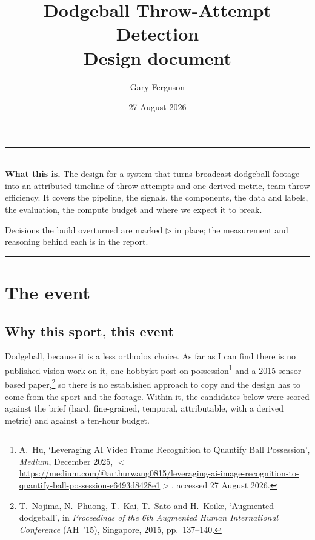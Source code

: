 \documentclass[10pt,a4paper]{article}
\title{\vspace{-16mm}\bfseries\color{slate}Dodgeball Throw-Attempt Detection\\[1mm]
       \large\mdseries Design document}
\author{Gary Ferguson}
\date{\vspace{-2mm}27 August 2026}
\begin{document}
\maketitle
\thispagestyle{empty}

\noindent
\begin{minipage}{\textwidth}
\small\color{slate}
\rule{\textwidth}{0.4pt}\\[3pt]
\textbf{What this is.} The design for a system that turns broadcast dodgeball footage
into an attributed timeline of throw attempts and one derived metric, team throw
efficiency. It covers the pipeline, the signals, the components, the data and labels,
the evaluation, the compute budget and where we expect it to break.

Decisions the build overturned are marked \textcolor{accent!88!black}{$\triangleright$}
in place; the measurement and reasoning behind each is in the report.\\[2pt]
\rule{\textwidth}{0.4pt}
\end{minipage}

\vspace{1mm}
{\small\setcounter{tocdepth}{2}\tableofcontents}
\clearpage

\section{The event}

\subsection{Why this sport, this event}

Dodgeball, because it is a less orthodox choice. As far as I can find there is no published
vision work on it, one hobbyist post on possession\footnote{A.\ Hu, `Leveraging
AI Video Frame Recognition to Quantify Ball Possession', \emph{Medium}, December 2025,
$<$\url{https://medium.com/@arthurwang0815/leveraging-ai-image-recognition-to-quantify-ball-possession-e6493d8428e1}$>$,
accessed 27 August 2026.} and a 2015 sensor-based
paper,\footnote{T.\ Nojima, N.\ Phuong,
T.\ Kai, T.\ Sato and H.\ Koike, `Augmented dodgeball', in \emph{Proceedings of the 6th
Augmented Human International Conference} (AH~'15), Singapore, 2015, pp.\ 137--140.} so there is no established approach to copy and the design has to come from
the sport and the footage. Within it, the candidates below were scored against the brief
(hard, fine-grained, temporal, attributable, with a derived metric) and against a ten-hour
budget.
\end{document}
